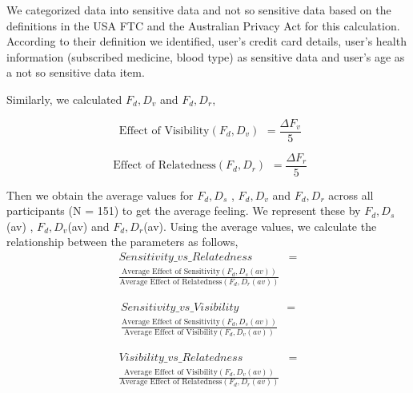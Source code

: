 \documentclass[conference]{IEEEtran}
\begin{document}
We categorized data into sensitive data and not so sensitive data based on the definitions in the USA FTC \cite {usa2016data} and the Australian Privacy Act \cite {australian2014data} for this calculation. According to their definition we identified, user's credit card details, user's health information (subscribed medicine, blood type) as sensitive data and user's age as a not so sensitive data item. 

Similarly, we calculated $F_d,D_v$ and $F_d,D_r$,

\[ \begin{aligned} \text{Effect of Visibility} (F_{d},D_{v}) \end{aligned} =
\frac{\Delta F_{v}}%
 {5}
\]

\[ \begin{aligned} \text{Effect of Relatedness} (F_{d},D_{r})\end{aligned} =
\frac{\Delta F_{r}}%
 {5}
\]

Then we obtain the average values for $F_d,D_s$ , $F_d,D_v$ and $F_d,D_r$ across all participants (N = 151) to get the average feeling. We represent these by $F_d,D_s$(av) , $F_d,D_v$(av) and $F_d,D_r$(av). Using the average values, we calculate the relationship between the parameters as follows,
 \begin{equation} \label{eq1}
\begin{split}
Sensitivity\_vs\_Relatedness & = \\ \frac{\text{Average Effect of Sensitivity}(F_{d},D_{s}(av)) }{\text{Average Effect of Relatedness}(F_{d},D_{r}(av))} 
\end{split}
\end{equation}

 \begin{equation} \label{eq1}
\begin{split}
Sensitivity\_vs\_Visibility & = \\ \frac{\text{Average Effect of Sensitivity}(F_{d},D_{s}(av))}{\text{Average Effect of Visibility}(F_{d},D_{v}(av)) } 
\end{split}
\end{equation}

 \begin{equation} \label{eq1}
\begin{split}
Visibility\_vs\_Relatedness & = \\ \frac{\text{Average Effect of Visibility}(F_{d},D_{v}(av)) }{\text{Average Effect of Relatedness}(F_{d},D_{r}(av))} 
\end{split}
\end{equation}
\end{document}
